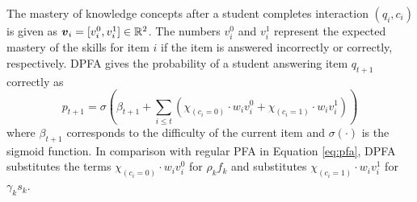 The mastery of knowledge concepts after a student completes interaction $(q_i, c_i)$ is given as $\boldsymbol{v}_i = [v_i^0, v_i^1] \in \mathbb{R}^2$. The numbers $v_i^0$ and $v_i^1$ represent the expected mastery of the skills for item $i$ if the item is answered incorrectly or correctly, respectively. DPFA gives the probability of a student answering item $q_{t+1}$ correctly as
\begin{equation}
  p_{t+1} = \sigma\left( \beta_{t+1} + \sum_{i \leq t} \left( \chi_{(c_i=0)}\cdot w_i v_i^0 + \chi_{(c_i=1)} \cdot w_i v_i^1 \right) \right)
  \label{eq:dpfa}
\end{equation}
where $\beta_{t+1}$ corresponds to the difficulty of the current item and $\sigma(\cdot)$ is the sigmoid function. In comparison with regular PFA in Equation \ref{eq:pfa}, DPFA substitutes the terms $\chi_{(c_i=0)}\cdot w_i v_i^0$ for $\rho_k f_k$ and substitutes $\chi_{(c_i=1)} \cdot w_i v_i^1$ for $\gamma_k s_k$.

